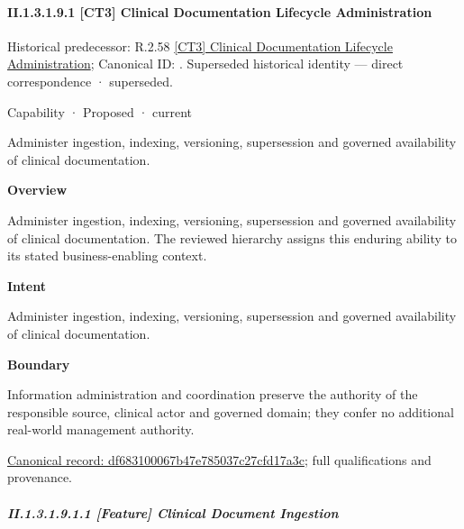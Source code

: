 \paragraph*{II.1.3.1.9.1 [CT3] Clinical Documentation Lifecycle Administration}
\label{navigation:II.1.3.1.9.1}

{\small Historical predecessor: R.2.58 \hyperref[element:5b1636373a8d4e788b3ddbc1659a47ef]{[CT3] Clinical Documentation Lifecycle Administration}; Canonical ID: \texttt{}. Superseded historical identity — direct correspondence · superseded.}\par
\label{element:df683100067b47e785037c27cfd17a3c}
{\small Capability · Proposed · current}\par

Administer ingestion, indexing, versioning, supersession and governed availability of clinical documentation.



\textbf{Overview}



Administer ingestion, indexing, versioning, supersession and governed availability of clinical documentation. The reviewed hierarchy assigns this enduring ability to its stated business-enabling context.



\textbf{Intent}



Administer ingestion, indexing, versioning, supersession and governed availability of clinical documentation.



\textbf{Boundary}



Information administration and coordination preserve the authority of the responsible source, clinical actor and governed domain; they confer no additional real-world management authority.


{\footnotesize \href{../../../../continuum/strategy/capability/df683100067b47e785037c27cfd17a3c.md}{Canonical record: df683100067b47e785037c27cfd17a3c}; full qualifications and provenance.}\par
\subparagraph*{II.1.3.1.9.1.1 [Feature] Clinical Document Ingestion}
\label{navigation:II.1.3.1.9.1.1}

